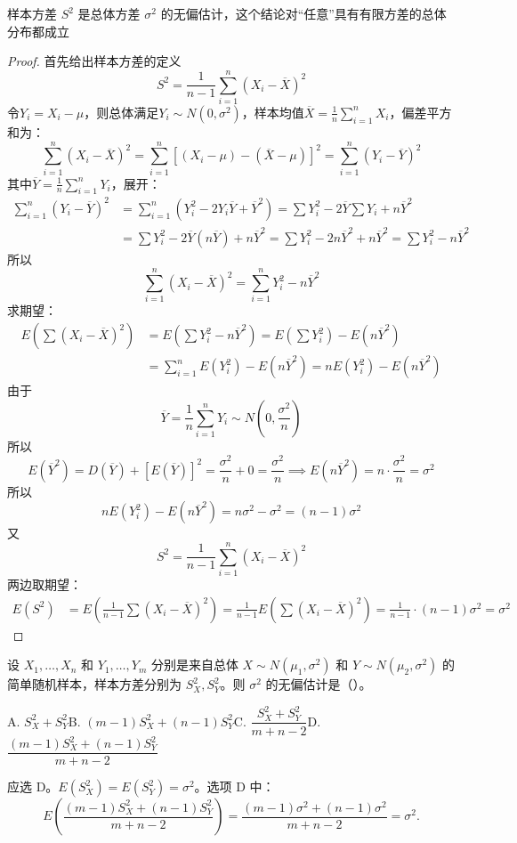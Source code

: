\documentclass[lang=cn,11pt]{elegantbook}
\begin{document}
\begin{proposition}[样本方差的无偏性]\label{prop:sample-variance-unbiased}
    样本方差 $S^2$ 是总体方差 $\sigma^2$ 的无偏估计，这个结论对“任意”具有有限方差的总体分布都成立
\end{proposition}
\begin{proof}
首先给出样本方差的定义\[S^2 = \frac{1}{n-1}\sum_{i=1}^n (X_i - \overline{X})^2\]
令$Y_i = X_i - \mu$，则总体满足$Y_i \sim N(0,\sigma^2)$，样本均值$\overline{X} = \frac{1}{n}\sum_{i=1}^n X_i$，偏差平方和为：
\[\sum_{i=1}^n (X_i - \overline{X})^2= \sum_{i=1}^n [(X_i - \mu) - (\overline{X} - \mu)]^2
= \sum_{i=1}^n (Y_i - \overline{Y})^2\]
其中$\overline{Y} = \frac{1}{n}\sum_{i=1}^n Y_i$，展开：
\begin{align*}
\sum_{i=1}^n (Y_i - \overline{Y})^2&= \sum_{i=1}^n (Y_i^2 - 2Y_i\overline{Y} + \overline{Y}^2) = \sum Y_i^2 - 2\overline{Y}\sum Y_i + n\overline{Y}^2\\
&= \sum Y_i^2 - 2\overline{Y}(n\overline{Y}) + n\overline{Y}^2 = \sum Y_i^2 - 2n\overline{Y}^2 + n\overline{Y}^2 = \sum Y_i^2 - n\overline{Y}^2
\end{align*}
所以$$\sum_{i=1}^n (X_i - \overline{X})^2= \sum_{i=1}^n Y_i^2 - n\overline{Y}^2$$
求期望：
\begin{align*}
E\left(\sum (X_i-\overline{X})^2\right)&= E\left(\sum Y_i^2 - n\overline{Y}^2\right) =E(\sum Y_i^2) - E(n\overline{Y}^2) \\
&= \sum_{i=1}^n E(Y_i^2)- E(n\overline{Y}^2)= n E(Y_i^2)- E(n\overline{Y}^2)
\end{align*}
由于$$\overline{Y} = \frac{1}{n}\sum_{i=1}^n Y_i \sim N\left(0,\frac{\sigma^2}{n}\right)$$所以
$$E(\overline{Y}^2) = D(\overline{Y}) + [E(\overline{Y})]^2 = \frac{\sigma^2}{n} + 0 = \frac{\sigma^2}{n}\implies E(n\overline{Y}^2) = n \cdot \frac{\sigma^2}{n} = \sigma^2$$
所以\[n E(Y_i^2)- E(n\overline{Y}^2) = n\sigma^2 - \sigma^2 = (n-1)\sigma^2\]
又$$S^2 = \frac{1}{n-1}\sum_{i=1}^n (X_i - \overline{X})^2$$
两边取期望：
$$
\begin{aligned}
E(S^2)&= E\left( \frac{1}{n-1}\sum (X_i-\overline{X})^2 \right) = \frac{1}{n-1} E\left(\sum (X_i-\overline{X})^2\right) = \frac{1}{n-1} \cdot (n-1)\sigma^2 = \sigma^2
\end{aligned}
$$
\end{proof}

\begin{exercise}\label{exer:7-sigma2-unbiased}
设 \(X_1, \dots, X_n\) 和 \(Y_1, \dots, Y_m\) 分别是来自总体 \(X \sim N(\mu_1, \sigma^2)\) 和 \(Y \sim N(\mu_2, \sigma^2)\) 的简单随机样本，样本方差分别为 \(S_X^2, S_Y^2\)。则 \(\sigma^2\) 的无偏估计是（\quad）。\par
A. \(S_X^2 + S_Y^2\)\quad B. \((m-1)S_X^2 + (n-1)S_Y^2\)\quad C. \(\dfrac{S_X^2+S_Y^2}{m+n-2}\)\quad D. \(\dfrac{(m-1)S_X^2+(n-1)S_Y^2}{m+n-2}\)
\end{exercise}
\begin{solution}
应选 D。\(E(S_X^2) = E(S_Y^2) = \sigma^2\)。选项 D 中：
\[
E\!\left(\frac{(m-1)S_X^2+(n-1)S_Y^2}{m+n-2}\right) = \frac{(m-1)\sigma^2+(n-1)\sigma^2}{m+n-2} = \sigma^2.
\]
\end{solution}
\end{document}
